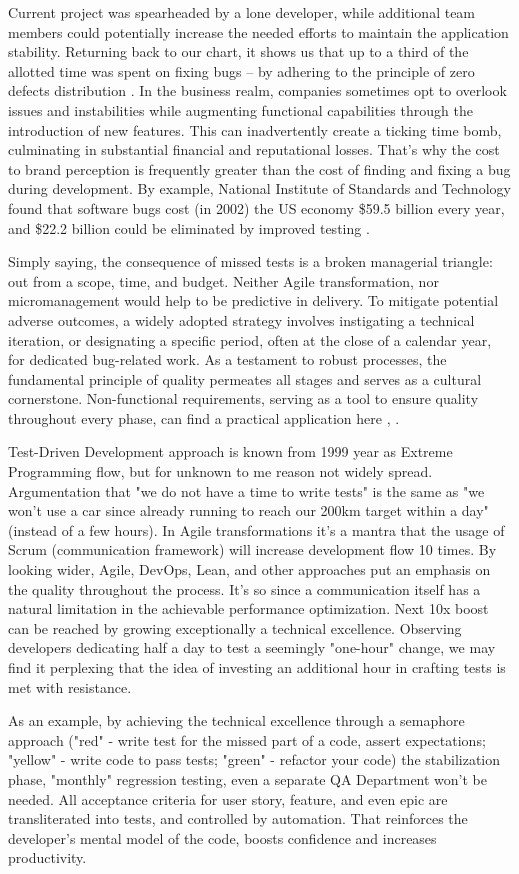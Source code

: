 \newpage
Current project was spearheaded by a lone developer, while additional team members could potentially increase 
the needed efforts \cite{Alm21} to maintain the application stability. Returning back to our chart, it shows us 
that up to a third of the allotted time was spent on fixing bugs -- by adhering to the principle of zero 
defects distribution \cite{Allan98}. In the business realm, companies sometimes opt to overlook issues and instabilities 
while augmenting functional capabilities through the introduction of new features. This can inadvertently create a ticking 
time bomb, culminating in substantial financial and reputational losses. That's why the cost to brand perception is 
frequently greater than the cost of finding and fixing a bug during development. By example, National Institute of 
Standards and Technology found that software bugs cost (in 2002) the US economy \$59.5 billion every year, and 
\$22.2 billion could be eliminated by improved testing \cite{RTI02}.

Simply saying, the consequence of missed tests is a broken managerial triangle: out from a scope, time, and budget.
Neither Agile transformation, nor micromanagement would help to be predictive in delivery. To mitigate potential adverse 
outcomes, a widely adopted strategy involves instigating a technical iteration, or designating a specific period, often 
at the close of a calendar year, for dedicated bug-related work. As a testament to robust processes, the fundamental 
principle of quality permeates all stages and serves as a cultural cornerstone. Non-functional requirements, serving 
as a tool to ensure quality throughout every phase, can find a practical application here \cite{Sam17}, \cite{Suz12}. 

Test-Driven Development approach is known from 1999 year as Extreme Programming flow, but for unknown to me reason 
not widely spread. Argumentation that "we do not have a time to write tests" is the same as "we won't use a car since 
already running to reach our 200km target within a day" (instead of a few hours). In Agile transformations it's a mantra 
that the usage of Scrum (communication framework) will increase development flow 10 times. By looking wider, 
Agile, DevOps, Lean, and other approaches put an emphasis on the quality throughout the process. It's so since a 
communication itself has a natural limitation in the achievable performance optimization. Next 10x boost can be reached 
by growing exceptionally a technical excellence. Observing developers dedicating half a day to test a seemingly 
"one-hour" change, we may find it perplexing that the idea of investing an additional hour in crafting tests is met with 
resistance.

As an example, by achieving the technical excellence through a semaphore approach ("red" - write test for the missed 
part of a code, assert expectations; "yellow" - write code to pass tests; "green" - refactor your code) the 
stabilization phase, "monthly" regression testing, even a separate QA Department won't be needed. All acceptance 
criteria for user story, feature, and even epic are transliterated into tests, and controlled by automation. That 
reinforces the developer's mental model of the code, boosts confidence and increases productivity.
